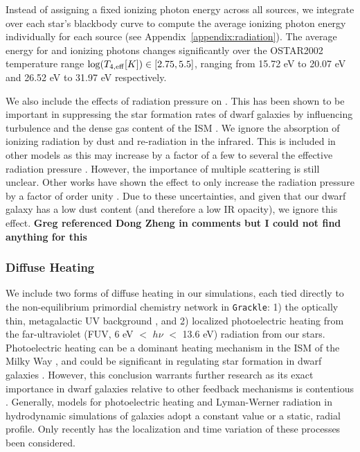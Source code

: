 \documentclass[twocolumn]{aastex61}
\begin{document}

Instead of assigning a fixed ionizing photon energy across all sources, we integrate over each star's blackbody curve to compute the average ionizing photon energy individually for each source (see Appendix~\ref{appendix:radiation}). The average energy for  and  ionizing photons changes significantly over the OSTAR2002 temperature range $\log(T_{4,\rm{eff}} [K]) \in \left[2.75,5.5\right]$, ranging from 15.72 eV to 20.07 eV and 26.52 eV to 31.97 eV respectively.

We also include the effects of radiation pressure on . This has been shown to be important in suppressing the star formation rates of dwarf galaxies by influencing turbulence and the dense gas content of the ISM \citep{WiseAbel2012,Ceverino2014}. We ignore the absorption of ionizing radiation by dust and re-radiation in the infrared. This is included in other models \citep[e.g.][]{Rosdahl2015,FIRE,FIRE2} as this may increase by a factor of a few to several the effective radiation pressure \citep{ZhangDavis2017}. However, the importance of multiple scattering is still unclear. Other works have shown the effect to only increase the radiation pressure by a factor of order unity \citep{Krumholz2012,Krumholz2013,Reissl2017}. Due to these uncertainties, and given that our dwarf galaxy has a low dust content (and therefore a low IR opacity), we ignore this effect. \textbf{Greg referenced Dong Zheng in comments but I could not find anything for this}

\subsubsection{Diffuse  Heating}
\label{sec:diffusive heating}
We include two forms of diffuse heating in our simulations, each tied directly to the non-equilibrium primordial chemistry network in \texttt{Grackle}: 1) the optically thin, metagalactic UV background \citep{HM2012}, and 2) localized photoelectric heating from the far-ultraviolet (FUV, 6 eV $<$ $h\nu$ $<$ 13.6 eV) radiation from our stars. Photoelectric heating can be a dominant heating mechanism in the ISM of the Milky Way \citep{Parravano2003}, and could be significant in regulating star formation in dwarf galaxies \citep{Forbes2016}. However, this conclusion warrants further research as its exact importance in dwarf galaxies relative to other feedback mechanisms is contentious \citep{Hu2016,Hu2017}. Generally, models for photoelectric heating and Lyman-Werner radiation in hydrodynamic simulations of galaxies adopt a constant value or a static, radial profile. Only recently has the localization and time variation of these processes been considered.
\end{document}
